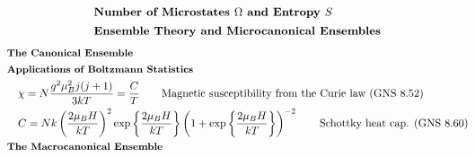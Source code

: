 \documentclass[10pt]{article}
\newcommand{\lrp}[1]{\left( #1 \right)}
\newcommand{\lrc}[1]{\left\{ #1 \right\}}
\begin{document}
\begin{multicols}{2}
	\setlength{\abovedisplayskip}{0pt}
	\setlength{\belowdisplayskip}{0pt}
	\setlength{\abovedisplayshortskip}{0pt}
	\setlength{\belowdisplayshortskip}{0pt}
	\begin{align*}
	& \small \hspace{-10pt} \textbf{Number of Microstates $\Omega$ and Entropy $S$} \small \\	
	& \small \hspace{-10pt} \textbf{Ensemble Theory and Microcanonical Ensembles} \small \\

	\end{align*} \newpage
	\setlength{\abovedisplayskip}{-25pt}
	\setlength{\belowdisplayskip}{-10pt}
	\setlength{\abovedisplayshortskip}{0pt}
	\setlength{\belowdisplayshortskip}{0pt}
	\begin{align*} 
	& \small \hspace{-10pt} \textbf{The Canonical Ensemble} \small \\

	& \small \hspace{-10pt} \textbf{Applications of Boltzmann Statistics} \small \\
		& \chi =N \frac{g^2 \mu_B^2 j(j+1)}{3kT} = \frac{C}{T}	\tag*{Magnetic susceptibility from the Curie law (GNS 8.52)} \\
		& C = Nk \lrp{\frac{2 \mu_B H}{kT}}^2 \exp \lrc{\frac{2 \mu_B H}{kT}} \lrp{1 + \exp\lrc{\frac{2 \mu_B H}{kT}}}^{-2}		\tag*{Schottky heat cap. (GNS 8.60)} \\
	& \small \hspace{-10pt} \textbf{The Macrocanonical Ensemble} \small \\

	\end{align*}
	
\end{multicols}
 
\end{document}

